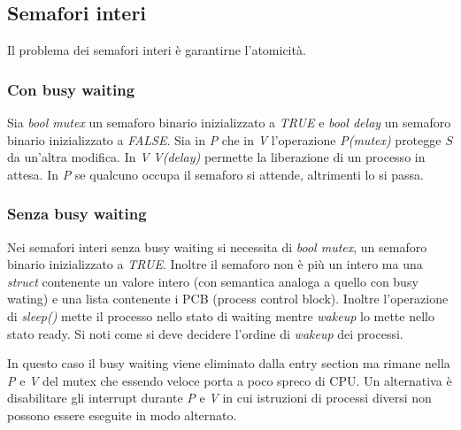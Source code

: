 \subsection{Semafori interi}
Il problema dei semafori interi \`e garantirne l'atomicit\`a. 

\subsubsection{Con busy waiting}
Sia \emph{bool mutex} un semaforo binario inizializzato a \emph{TRUE} e \emph{bool delay} un semaforo binario inizializzato a \emph{FALSE}. Sia in \emph{P} che in \emph{V} l'operazione
\emph{P(mutex)} protegge $S$ da un'altra modifica. In \emph{V} \emph{V(delay)} permette la liberazione di un processo in attesa. In \emph{P} se qualcuno occupa il semaforo si attende, 
altrimenti lo si passa. 
\begin{multicols}{2}
	
	\columnbreak
	
\end{multicols}
\subsubsection{Senza busy waiting}
Nei semafori interi senza busy waiting si necessita di \emph{bool mutex}, un semaforo binario inizializzato a \emph{TRUE}. Inoltre il semaforo non \`e pi\`u un intero ma una 
\emph{struct} contenente un valore intero (con semantica analoga a quello con busy wating) e una lista contenente i PCB (process control block). Inoltre l'operazione di \emph{sleep()}
mette il processo nello stato di waiting mentre \emph{wakeup} lo mette nello stato ready. Si noti come si deve decidere l'ordine di \emph{wakeup} dei processi.

\begin{multicols}{2}
	
	\columnbreak
	
\end{multicols}
In questo caso il busy waiting viene eliminato dalla entry section ma rimane nella \emph{P} e \emph{V} del mutex che essendo veloce porta a poco spreco di CPU. Un alternativa \`e 
disabilitare gli interrupt durante \emph{P} e \emph{V} in cui istruzioni di processi diversi non possono essere eseguite in modo alternato. 
